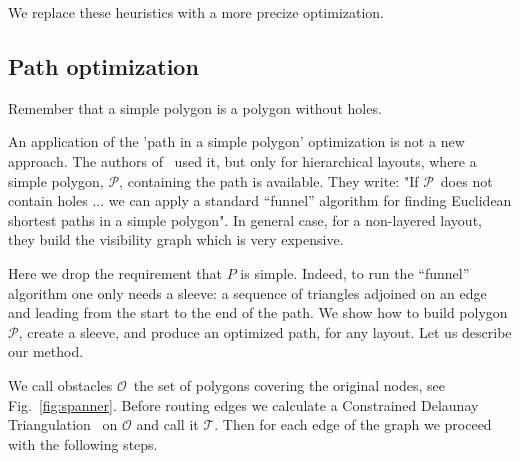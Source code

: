 \documentclass{gd-llncs}
\newcommand{\plg}{$\mathcal{P}$}
\begin{document}
We replace these heuristics with a more precize optimization.
\subsection*{Path optimization} {
Remember that a simple polygon is a polygon without holes.

An application of the 'path in a simple polygon' optimization is not a new approach. The authors of~\cite{dobkin1997implementing} used it, but only for hierarchical layouts, where a simple polygon, \plg, containing the path is available. They write: "If \plg~does not contain holes ... we can apply a standard “funnel” algorithm \cite{chazelle1982theorem,hershberger1994computing} for finding Euclidean shortest paths in a simple polygon". In general case, for a non-layered layout, they build the visibility graph which is very expensive.

Here we drop the requirement that $P$ is simple. Indeed, to run the “funnel” algorithm one only needs a sleeve: a sequence of triangles adjoined on an edge and leading from the start to the end of the path.  We show how to build polygon \plg, create a sleeve, and produce an optimized path, for any layout.
Let us describe our method.

We call obstacles $\mathcal{O}$~the set of polygons covering the original nodes, see Fig.~\ref{fig:spanner}. Before routing edges we calculate a Constrained Delaunay Triangulation~\cite{delaunay1934sphere} on $\mathcal{O}$ and call it $\mathcal{T}$. Then for each edge of the graph we proceed with the following steps.

}
\end{document}
